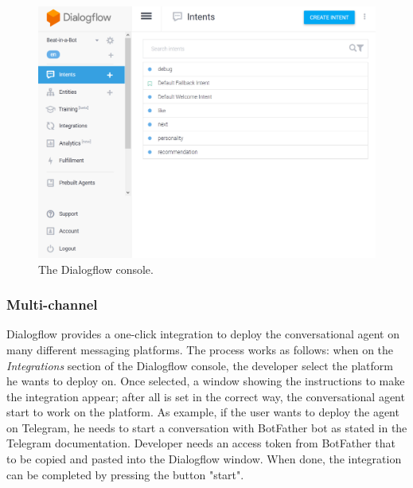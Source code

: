 \documentclass[b5paper,10pt,twoside,cucitura]{toptesi}
\begin{document}
\begin{figure}[ht]
\centering
\includegraphics[scale=0.47]{dialogflow_console.png}
\caption{The Dialogflow console.}
\end{figure}

\subsubsection{Multi-channel}

Dialogflow provides a one-click integration to deploy the conversational agent on many different messaging platforms. The process works as follows: when on the \textit{Integrations} section of the Dialogflow console, the developer select the platform he wants to deploy on. Once selected, a window showing the instructions to make the integration appear; after all is set in the correct way, the conversational agent start to work on the platform. As example, if the user wants to deploy the agent on Telegram, he needs to start a conversation with BotFather bot as stated in the Telegram documentation. Developer needs an access token from BotFather that to be copied and pasted into the Dialogflow window. When done, the integration can be completed by pressing the button "start".
\end{document}
